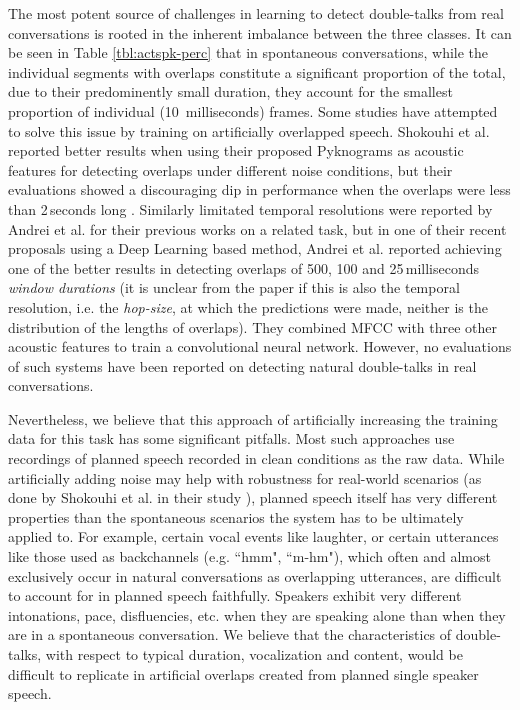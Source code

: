 \documentclass[a4paper]{article}
\begin{document}
The most potent source of challenges in learning to detect double-talks from real conversations
is rooted in the inherent imbalance between the three classes.
It can be seen in Table \ref{tbl:actspk-perc} that in spontaneous conversations,
while the individual segments with overlaps constitute a significant proportion of the total,
due to their predominently small duration,
they account for the smallest proportion of individual (10~milliseconds) frames.
Some studies have attempted to solve this issue by training on artificially overlapped speech.
Shokouhi et al. reported better results when using their proposed Pyknograms as acoustic features for detecting overlaps under different noise conditions,
but their evaluations showed a discouraging dip in performance when the overlaps were less than 2\,seconds long \cite{shokouhi_teager_2017}.
Similarly limitated temporal resolutions were reported by Andrei et al. for their previous works on a related task,
but in one of their recent proposals using a Deep Learning based method,
Andrei et al. reported achieving one of the better results in detecting overlaps of
500, 100 and 25\,milliseconds \textit{window durations} \cite{AndreiDetectingOverlappedSpeech2017}
(it is unclear from the paper if this is also the temporal resolution, i.e. the \textit{hop-size}, at which the predictions were made, neither is the distribution of the lengths of overlaps).
They combined MFCC with three other acoustic features to train a convolutional neural network.
However, no evaluations of such systems have been reported on detecting natural double-talks in real conversations.

Nevertheless, we believe that this approach of artificially increasing the training data for this task has some significant pitfalls.
Most such approaches use recordings of planned speech recorded in clean conditions as the raw data.
While artificially adding noise may help with robustness for real-world scenarios
(as done by Shokouhi et al. in their study \cite{shokouhi_teager_2017}),
planned speech itself has very different properties than
the spontaneous scenarios the system has to be ultimately applied to.
For example, certain vocal events like laughter,
or certain utterances like those used as backchannels (e.g. “hmm", “m-hm"),
which often and almost exclusively occur in natural conversations as overlapping utterances,
are difficult to account for in planned speech faithfully.
Speakers exhibit very different intonations, pace, disfluencies, etc. when
they are speaking alone than when they are in a spontaneous conversation.
We believe that the characteristics of double-talks,
with respect to typical duration, vocalization and content,
would be difficult to replicate in artificial overlaps created from planned single speaker speech.
\end{document}
